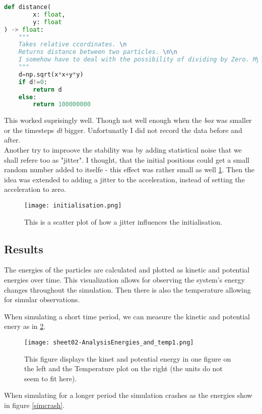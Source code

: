 \documentclass{article}
\begin{document}
\begin{lstlisting}[language=Python, caption=Countering "devide by zero" errors.]
def distance(
        x: float,
        y: float
) -> float:
    """
    Takes relative ccordinates. \n
    Returns distance between two particles. \n\n
    I somehow have to deal with the possibility of dividing by Zero. My idea is to set distance very large, so that the collision get "ignored".
    """
    d=np.sqrt(x*x+y*y)
    if d!=0:
        return d 
    else:
        return 100000000
\end{lstlisting}
This worked suprisingly well. Though not well enough when the \textit{box} was smaller or the timesteps \textit{dt} bigger. Unfortunatly I did not record the data before and after.\\
Another try to improove the stability was by adding statistical noise that we shall refere too as "jitter". I thought, that the initial positions could get a small random number added to itselfe - this effect was rather small as well \ref{initjitter_scatter}. Then the idea was extended to adding a jitter to the acceleration, instead of setting the acceleration to zero.

\begin{figure}
    \texttt{[image: initialisation.png]}
    \caption{This is a scatter plot of how a jitter influences the initialisation.}\label{initjitter_scatter}
\end{figure}


\subsection{Results}
The energies of the particles are calculated and plotted as kinetic and potential energies over time. This visualization allows for observing the system’s energy changes throughout the simulation. Then there is also the temperature allowing for simular observations.

When simulating a short time period, we can measure the kinetic and potential enery as in \ref{kinandpot}.

\begin{figure}[h]
    \texttt{[image: sheet02-AnalysisEnergies\_and\_temp1.png]}
    \caption{This figure displays the kinet and potential energy in one figure on the left and the Temperature plot on the right (the units do not seem to fit here). }\label{kinandpot}
\end{figure}

When simulating for a longer period the simulation crashes as the energies show in figure \ref{simcrash}.
\end{document}
